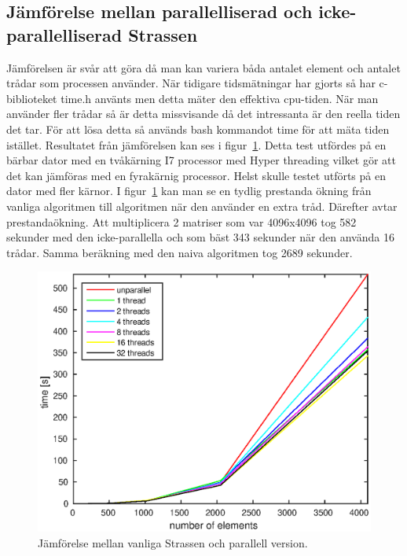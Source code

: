 \subsection{Jämförelse mellan parallelliserad och icke-parallelliserad Strassen}
Jämförelsen är svår att göra då man kan variera båda antalet element och antalet trådar som processen använder. När tidigare tidsmätningar har gjorts så har c-biblioteket time.h använts men detta mäter den effektiva cpu-tiden. När man använder fler trådar så är detta missvisande då det intressanta är den reella tiden det tar. För att lösa detta så används bash kommandot time för att mäta tiden istället. Resultatet från jämförelsen kan ses i figur~\ref{fig:threads}. Detta test utfördes på en bärbar dator med en tvåkärning I7 processor med Hyper threading vilket gör att det kan jämföras med en fyrakärnig processor. Helst skulle testet utförts på en dator med fler kärnor. I figur~\ref{fig:threads} kan man se en tydlig prestanda ökning från vanliga algoritmen till algoritmen när den använder en extra tråd. Därefter avtar prestandaökning. Att multiplicera 2 matriser som var 4096x4096 tog 582 sekunder med den icke-parallella och som bäst 343 sekunder när den använda 16 trådar. Samma beräkning med den naiva algoritmen tog 2689 sekunder. 

\begin{figure}[H]
	\begin{center}
		\includegraphics[scale=0.6]{martin-tex/threads_test.eps}
	\end{center}
	\caption{Jämförelse mellan vanliga Strassen och parallell version.}
	\label{fig:threads}
\end{figure}



